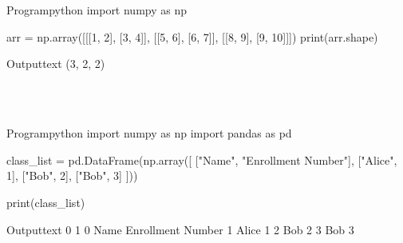 \documentclass[11pt]{ipu-python}
\begin{document}
    \\~\\
    \begin{code}
        {Program}{python}
import numpy as np

arr = np.array([[[1, 2], [3, 4]], [[5, 6], [6, 7]], [[8, 9], [9, 10]]])
print(arr.shape)
    \end{code}
    \begin{code}
        {Output}{text}
(3, 2, 2)
    \end{code}

    \\~\\
    \begin{code}
        {Program}{python}
import numpy as np
import pandas as pd

class_list = pd.DataFrame(np.array([
    ["Name", "Enrollment Number"],
    ["Alice", 1],
    ["Bob", 2],
    ["Bob", 3]
]))

print(class_list)
    \end{code}
    \begin{code}
        {Output}{text}
       0                  1
0   Name  Enrollment Number
1  Alice                  1
2    Bob                  2
3    Bob                  3
    \end{code}
\end{document}
